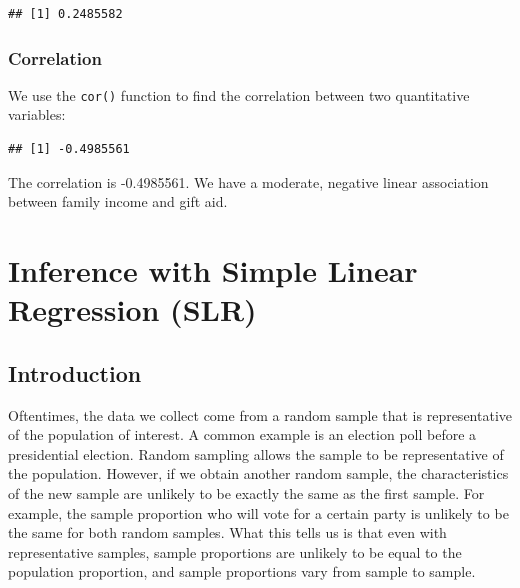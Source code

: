 \documentclass[
]{book}
\newenvironment{Shaded}{\begin{snugshade}}{\end{snugshade}}
\newcommand{\DocumentationTok}[1]{\textcolor[rgb]{0.56,0.35,0.01}{\textbf{\textit{#1}}}}
\newcommand{\FunctionTok}[1]{\textcolor[rgb]{0.13,0.29,0.53}{\textbf{#1}}}
\newcommand{\NormalTok}[1]{#1}
\newcommand{\SpecialCharTok}[1]{\textcolor[rgb]{0.81,0.36,0.00}{\textbf{#1}}}
\begin{document}
\begin{verbatim}
## [1] 0.2485582
\end{verbatim}

\subsection*{Correlation}\label{correlation-1}

We use the \texttt{cor()} function to find the correlation between two quantitative variables:

\begin{Shaded}
\end{Shaded}

\begin{verbatim}
## [1] -0.4985561
\end{verbatim}

The correlation is -0.4985561. We have a moderate, negative linear association between family income and gift aid.

\chapter{Inference with Simple Linear Regression (SLR)}\label{inf}

\section{Introduction}\label{introduction}

Oftentimes, the data we collect come from a random sample that is representative of the population of interest. A common example is an election poll before a presidential election. Random sampling allows the sample to be representative of the population. However, if we obtain another random sample, the characteristics of the new sample are unlikely to be exactly the same as the first sample. For example, the sample proportion who will vote for a certain party is unlikely to be the same for both random samples. What this tells us is that even with representative samples, sample proportions are unlikely to be equal to the population proportion, and sample proportions vary from sample to sample.
\end{document}
